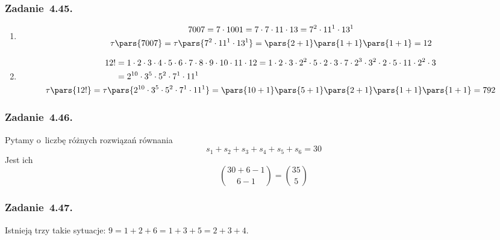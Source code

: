 \subsubsection*{Zadanie~4.45.}
\begin{enumerate}[label={\alph*)}]
    \item
        \begin{gather*}
            7007
                = 7 \cdot 1001
                = 7 \cdot 7 \cdot 11 \cdot 13
                = 7^2 \cdot 11^1 \cdot 13^1\\
            \tau\pars{7007}
                = \tau\pars{7^2 \cdot 11^1 \cdot 13^1}
                = \pars{2 + 1}\pars{1 + 1}\pars{1 + 1}
                = 12
        \end{gather*}
    \item
        \begin{gather*}
            \begin{split}
                12!
                    &= 1 \cdot 2 \cdot 3 \cdot 4 \cdot 5 \cdot 6 \cdot 7 \cdot 8 \cdot 9 \cdot 10 \cdot 11 \cdot 12
                    = 1 \cdot 2 \cdot 3 \cdot 2^2 \cdot 5 \cdot 2 \cdot 3 \cdot 7 \cdot 2^3 \cdot 3^2 \cdot 2 \cdot 5 \cdot 11 \cdot 2^2 \cdot 3\\
                    &= 2^{10} \cdot 3^5 \cdot 5^2 \cdot 7^1 \cdot 11^1
            \end{split}\\
            \tau\pars{12!}
                = \tau\pars{2^{10} \cdot 3^5 \cdot 5^2 \cdot 7^1 \cdot 11^1}
                = \pars{10 + 1}\pars{5 + 1}\pars{2 + 1}\pars{1 + 1}\pars{1 + 1}
                = 792
        \end{gather*}
\end{enumerate}
\subsubsection*{Zadanie~4.46.}
Pytamy o~liczbę różnych rozwiązań równania
\begin{equation*}
    s_1 + s_2 + s_3 + s_4 + s_5 + s_6 = 30
\end{equation*}
Jest ich
\begin{equation*}
    \binom{30 + 6 - 1}{6 - 1}
        = \binom{35}{5}
\end{equation*}
\subsubsection*{Zadanie~4.47.}
Istnieją trzy takie sytuacje: \(9 = 1 + 2 + 6 = 1 + 3 + 5 = 2 + 3 + 4\).
